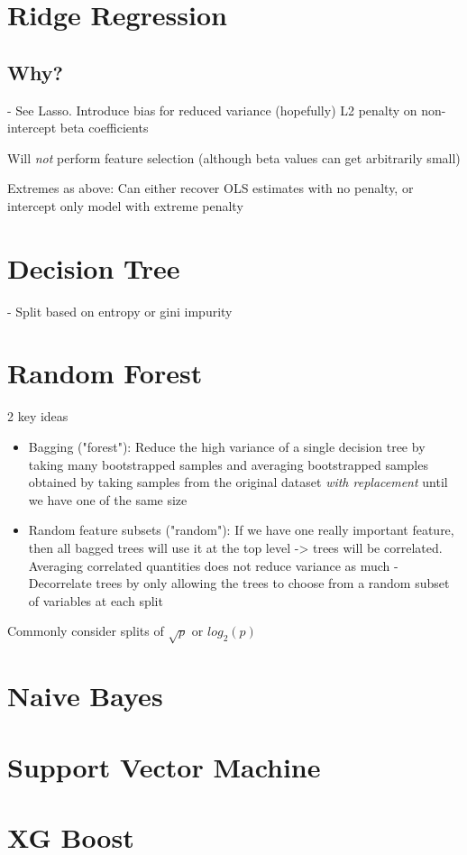 \documentclass{article}
\begin{document}
\section{Ridge Regression}

\subsection{Why?}
	- See Lasso. Introduce bias for reduced variance (hopefully)
L2 penalty on non-intercept beta coefficients

Will \textit{not} perform feature selection (although beta values can get arbitrarily small)

Extremes as above: Can either recover OLS estimates with no penalty, or intercept only model with extreme penalty

\section{Decision Tree}

- Split based on entropy or gini impurity

\section{Random Forest}
2 key ideas
\begin{itemize}
	\item Bagging ("forest"): Reduce the high variance of a single decision tree by taking many bootstrapped samples and averaging bootstrapped samples obtained by taking samples 	from the original dataset \textit{with replacement} until we have one of the same size
	\item Random feature subsets ("random"): If we have one really important feature, then all bagged trees will use it at the top level -> trees will be correlated. Averaging correlated 		quantities does not reduce variance as much
		- Decorrelate trees by only allowing the trees to choose from a random subset of variables at each split
\end{itemize}

Commonly consider splits of $\sqrt{p}$ or $log_2(p)	$

\section{Naive Bayes}

\section{Support Vector Machine}

\section{XG Boost}
\end{document}
